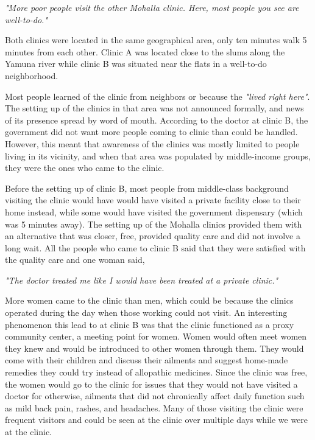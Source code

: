 \textit{"More poor people visit the other Mohalla clinic. Here, most people 
you see are well-to-do."}    
% 

Both clinics were located in the same geographical area, only ten minutes walk 5 minutes from each other. Clinic A was located close to the slums along the Yamuna river while clinic B was situated near the flats in a well-to-do neighborhood. %

Most people learned of the clinic from neighbors or because the  \textit{"lived right here"}. The setting up of the clinics in that area was not announced formally, and news of its presence spread by word of mouth. According to the doctor at clinic B, the government did not want more people coming to clinic than could be handled. However, this meant that awareness of the clinics was mostly limited to people living in its vicinity, and when that area was populated by middle-income groups, they were the ones who came to the clinic.

Before the setting up of clinic B, most people from middle-class background visiting the clinic would have would have visited a private facility close to their home instead, while some would have visited the government dispensary (which was 5 minutes away). The setting up of the Mohalla clinics provided them with an alternative that was closer, free, provided quality care and did not involve a long wait. All the people who came to clinic B said that they were satisfied with the quality care and one woman said,

\textit{"The doctor treated me like I would have been treated at a private clinic."}

More women came to the clinic than men, which could be because the clinics operated during the day when those working could not visit. An interesting phenomenon this lead to at clinic B was that the clinic functioned as a proxy community center, a meeting point for women. Women would often meet women they knew and would be introduced to other women through them. They would come with their children and discuss their ailments and suggest home-made remedies they could try instead of allopathic medicines. Since the clinic was free, the women would go to the clinic for issues that they would not have visited a doctor for otherwise, ailments that did not chronically affect daily function such as mild back pain, rashes, and headaches. Many of those visiting the clinic were frequent visitors and could be seen at the clinic over multiple days while we were at the clinic. 

